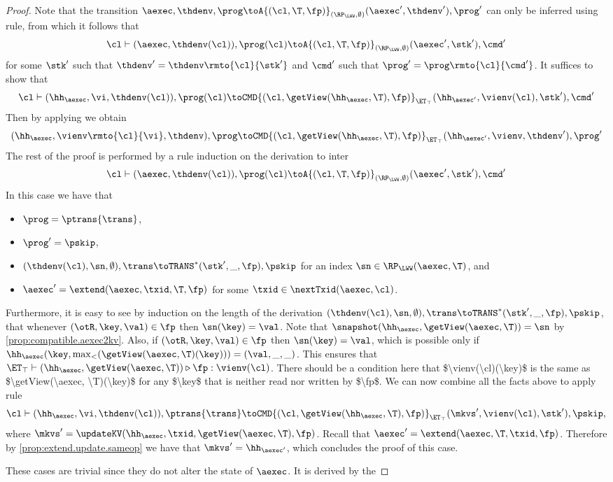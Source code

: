 \begin{proof}
Note that the transition 
$\aexec, \thdenv, \prog \toA{(\cl, \T, \fp)}_{(\RP_{\LWW}, \emptyset)} (\aexec', \thdenv'), \prog'$ 
can only be inferred using  rule, 
from which it follows that 
\[
    \cl \vdash (\aexec, \thdenv(\cl)), \prog(\cl) 
    \toA{(\cl, \T, \fp)}_{(\RP_{\LWW}, \emptyset)} (\aexec' ,\stk'), \cmd'
\]
for some $\stk'$ such that $\thdenv' = \thdenv\rmto{\cl}{\stk'}$ 
and $\cmd'$ such that $\prog' = \prog\rmto{\cl}{\cmd'}$.
It suffices to show that 
\[
    \cl \vdash (\hh_\aexec, \vi, \thdenv(\cl)), \prog(\cl) 
   \toCMD{(\cl, \getView(\hh_{\aexec}, \T), \fp)}_{\ET_{\top}} 
    (\hh_{\aexec'}, \vienv(\cl), \stk'), \cmd'
\]
Then by applying  we obtain 
\[
    (\hh_{\aexec}, \vienv\rmto{\cl}{\vi}, \thdenv), \prog 
    \toCMD{(\cl, \getView(\hh_{\aexec}, \T), \fp)}_{\ET_{\top}} 
    (\hh_{\aexec'}, \vienv, \thdenv'), \prog'
\]
The rest of the proof is performed by a rule induction on the derivation to inter 
\[ 
    \cl \vdash (\aexec, \thdenv(\cl)), \prog(\cl) 
    \toA{(\cl, \T, \fp)}_{(\RP_{\LWW}, \emptyset)} (\aexec', \stk'), \cmd'
\]
In this case we have that 
\begin{itemize}
    \item $\prog = \ptrans{\trans}$, 
    \item $\prog' = \pskip$, 
    \item $(\thdenv(\cl), \sn, \emptyset), \trans \toTRANS^{\ast} (\stk', \_, \fp), \pskip$ for an index $\sn \in \RP_{\LWW}(\aexec, \T)$, and 
    \item $\aexec' = \extend(\aexec, \txid, \T, \fp)$ for some $\txid \in \nextTxid(\aexec, \cl)$. 
\end{itemize}
Furthermore, it is easy to see by induction on the length of the derivation 
$(\thdenv(\cl), \sn, \emptyset), \trans \toTRANS^{\ast} (\stk', \_, \fp), \pskip$, 
that whenever $(\otR, \key, \val) \in \fp$ then $\sn(\key) = \val$.
Note that $\snapshot(\hh_{\aexec}, \getView(\aexec, \T)) = \sn$ by \cref{prop:compatible.aexec2kv}.
Also, if $(\otR,\key, \val) \in \fp$ then $\sn(\key) = \val$, which is possible only if  
$\hh_{\aexec}(\key, \max_{<}(\getView(\aexec, \T)(\key))) = (\val, \_, \_)$.
This ensures that $\ET_{\top} \vdash (\hh_{\aexec}, \getView(\aexec, \T)) \triangleright \fp: \vienv(\cl)$. 
\ac{There should be a condition here that $\vienv(\cl)(\key)$ is the same as $\getView(\aexec, \T)(\key)$ 
for any $\key$ that is neither read nor written by $\fp$.} 
We can now combine all the facts above to apply rule 
\[
    \cl \vdash (\hh_{\aexec}, \vi, \thdenv(\cl)), \ptrans{\trans}
    \toCMD{(\cl, \getView(\hh_{\aexec}, \T), \fp)}_{\ET_{\top}} 
    (\mkvs', \vienv(\cl), \stk'), \pskip, 
\] 
where $\mkvs' = \updateKV(\hh_{\aexec}, \txid, \getView(\aexec, \T), \fp)$. 
Recall that $\aexec' = \extend(\aexec, \T, \txid, \fp)$. 
Therefore by \cref{prop:extend.update.sameop} we have that $\mkvs' = \hh_{\aexec'}$, 
which concludes the proof of this case.

These cases are trivial since they do not alter the state of \( \aexec \).
It is derived by the \ih
\end{proof}

